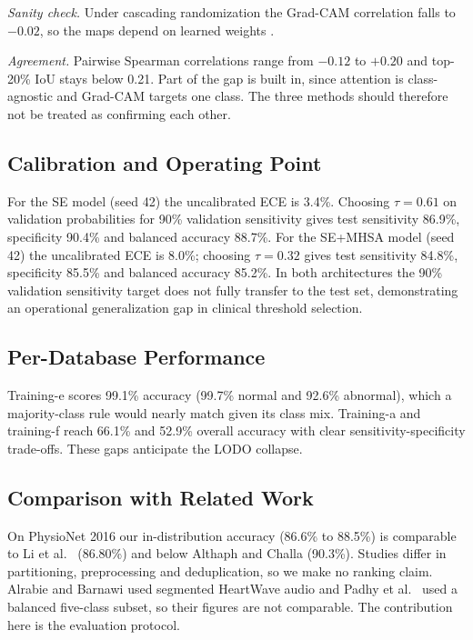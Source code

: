 \documentclass[conference]{IEEEtran}
\begin{document}
\textit{Sanity check.} Under cascading randomization the Grad-CAM correlation falls to $-0.02$, so the maps depend on learned weights \cite{adebayo}.

\textit{Agreement.} Pairwise Spearman correlations range from $-0.12$ to $+0.20$ and top-20\% IoU stays below 0.21. Part of the gap is built in, since attention is class-agnostic and Grad-CAM targets one class. The three methods should therefore not be treated as confirming each other.

\subsection{Calibration and Operating Point}
\label{sec:calib}


For the SE model (seed 42) the uncalibrated ECE is 3.4\%. Choosing $\tau=0.61$ on validation probabilities for 90\% validation sensitivity gives test sensitivity 86.9\%, specificity 90.4\% and balanced accuracy 88.7\%. For the SE+MHSA model (seed 42) the uncalibrated ECE is 8.0\%; choosing $\tau=0.32$ gives test sensitivity 84.8\%, specificity 85.5\% and balanced accuracy 85.2\%. In both architectures the 90\% validation sensitivity target does not fully transfer to the test set, demonstrating an operational generalization gap in clinical threshold selection.

\subsection{Per-Database Performance}


Training-e scores 99.1\% accuracy (99.7\% normal and 92.6\% abnormal), which a majority-class rule would nearly match given its class mix. Training-a and training-f reach 66.1\% and 52.9\% overall accuracy with clear sensitivity-specificity trade-offs. These gaps anticipate the LODO collapse.

\subsection{Comparison with Related Work}
On PhysioNet 2016 our in-distribution accuracy (86.6\% to 88.5\%) is comparable to Li et al.\ \cite{li} (86.80\%) and below Althaph and Challa \cite{althaph} (90.3\%). Studies differ in partitioning, preprocessing and deduplication, so we make no ranking claim. Alrabie and Barnawi \cite{alrabie} used segmented HeartWave audio and Padhy et al.\ \cite{padhy} used a balanced five-class subset, so their figures are not comparable. The contribution here is the evaluation protocol.
\end{document}
